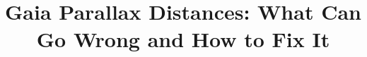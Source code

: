 \documentclass[preprint2]{aastex631}
\begin{document}
\title{Gaia Parallax Distances: What Can Go Wrong and How to Fix It}



\end{document}
